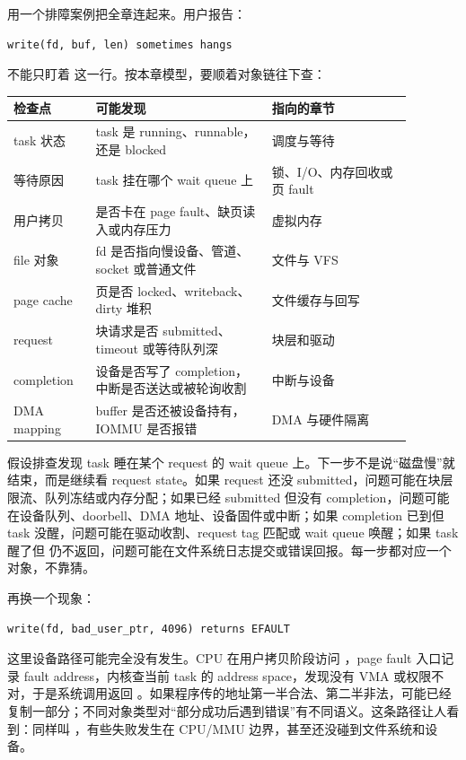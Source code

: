 用一个排障案例把全章连起来。用户报告：

\begin{lstlisting}
write(fd, buf, len) sometimes hangs
\end{lstlisting}

不能只盯着  这一行。按本章模型，要顺着对象链往下查：

\begin{longtable}{p{0.18\linewidth}p{0.39\linewidth}p{0.31\linewidth}}
\toprule
检查点 & 可能发现 & 指向的章节 \\
\midrule
task 状态 & task 是 running、runnable，还是 blocked & 调度与等待 \\
等待原因 & task 挂在哪个 wait queue 上 & 锁、I/O、内存回收或页 fault \\
用户拷贝 & 是否卡在 page fault、缺页读入或内存压力 & 虚拟内存 \\
file 对象 & fd 是否指向慢设备、管道、socket 或普通文件 & 文件与 VFS \\
page cache & 页是否 locked、writeback、dirty 堆积 & 文件缓存与回写 \\
request & 块请求是否 submitted、timeout 或等待队列深 & 块层和驱动 \\
completion & 设备是否写了 completion，中断是否送达或被轮询收割 & 中断与设备 \\
DMA mapping & buffer 是否还被设备持有，IOMMU 是否报错 & DMA 与硬件隔离 \\
\bottomrule
\end{longtable}

假设排查发现 task 睡在某个 request 的 wait queue 上。下一步不是说“磁盘慢”就结束，而是继续看 request state。如果 request 还没 submitted，问题可能在块层限流、队列冻结或内存分配；如果已经 submitted 但没有 completion，问题可能在设备队列、doorbell、DMA 地址、设备固件或中断；如果 completion 已到但 task 没醒，问题可能在驱动收割、request tag 匹配或 wait queue 唤醒；如果 task 醒了但  仍不返回，问题可能在文件系统日志提交或错误回报。每一步都对应一个对象，不靠猜。

再换一个现象：

\begin{lstlisting}
write(fd, bad_user_ptr, 4096) returns EFAULT
\end{lstlisting}

这里设备路径可能完全没有发生。CPU 在用户拷贝阶段访问 ，page fault 入口记录 fault address，内核查当前 task 的 address space，发现没有 VMA 或权限不对，于是系统调用返回 。如果程序传的地址第一半合法、第二半非法，可能已经复制一部分；不同对象类型对“部分成功后遇到错误”有不同语义。这条路径让人看到：同样叫 ，有些失败发生在 CPU/MMU 边界，甚至还没碰到文件系统和设备。

